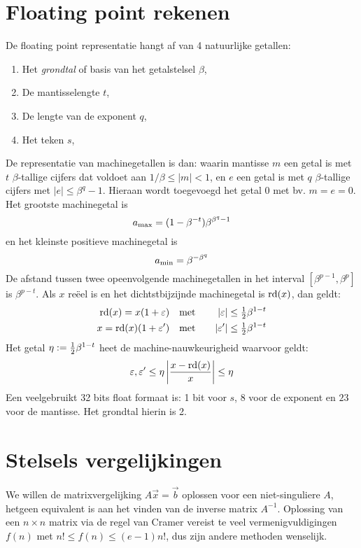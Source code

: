 \section{Floating point rekenen}
De floating point representatie hangt af van 4 natuurlijke getallen:
\begin{enumerate}
\item Het {\it grondtal} of basis van het getalstelsel $\beta$,
\item De mantisselengte $t$,
\item De lengte van de exponent $q$,
\item Het teken $s$,
\end{enumerate}
De representatie van machinegetallen is dan: 
waarin mantisse $m$ een getal is met $t$ $\beta$-tallige cijfers dat voldoet
aan $1/\beta\leq|m|<1$, en $e$ een getal is met $q$ $\beta$-tallige cijfers
met $|e|\leq\beta^q-1$. Hieraan wordt toegevoegd het getal 0 met bv. $m=e=0$.
Het grootste machinegetal is
\[
a_{\rm max}=(1-\beta^{-t})\beta^{\beta^q-1}
\]
en het kleinste positieve machinegetal is
\[
a_{\rm min}=\beta^{-\beta^q}
\]
De afstand tussen twee opeenvolgende machinegetallen in het interval
$[\beta^{p-1},\beta^p]$ is $\beta^{p-t}$. Als $x$ re\"eel is en het
dichtstbijzijnde machinegetal is ${\rm rd}(x)$, dan geldt:
\begin{eqnarray*}
{\rm rd}(x)=x(1+\varepsilon) &~~~\mbox{met}~~~&|\varepsilon|\leq\mbox{$\frac{1}{2}$}\beta^{1-t}\\
x={\rm rd}(x)(1+\varepsilon')&~~~\mbox{met}~~~&|\varepsilon'|\leq\mbox{$\frac{1}{2}$}\beta^{1-t}
\end{eqnarray*}
Het getal $\eta:=\mbox{$\frac{1}{2}$}\beta^{1-t}$ heet de machine-nauwkeurigheid waarvoor geldt:
\[
\varepsilon,\varepsilon'\leq\eta\left|\frac{x-{\rm rd}(x)}{x}\right|\leq\eta
\]
Een veelgebruikt 32 bits float formaat is: 1 bit voor $s$, 8 voor de exponent
en $23$ voor de mantisse. Het grondtal hierin is 2.

\section{Stelsels vergelijkingen}
We willen de matrixvergelijking $A\vec{x}=\vec{b}$ oplossen voor een
niet-singuliere $A$, hetgeen equivalent is aan het vinden van de inverse matrix
$A^{-1}$. Oplossing van een $n\times n$ matrix via de regel van Cramer vereist
te veel vermenigvuldigingen $f(n)$ met $n!\leq f(n)\leq (e-1)n!$, dus zijn
andere methoden wenselijk.

